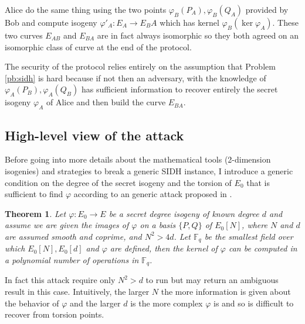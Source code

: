 \documentclass[12pt,a4paper]{article}
\newtheorem{theorem}{Theorem}
\begin{document}
	Alice do the same thing using the two points $\varphi_B(P_A),\varphi_B(Q_A)$ provided by Bob and
	compute isogeny  $\varphi'_A:E_A\to E_BA$ which has kernel $\varphi_B(\ker\varphi_A)$.
	These two curves $E_{AB}$ and $E_{BA}$ are in fact always isomorphic so they both agreed on an
	isomorphic class of curve at the end of the protocol.

	The security of the protocol relies entirely on the assumption that Problem \ref{pb:sidh} is hard
	because if not then an adversary,
	with the knowledge of $\varphi_A(P_B),\varphi_A(Q_B)$ has sufficient information to recover entirely
	the secret isogeny $\varphi_A$ of Alice and then build the curve $E_{BA}$.
	\subsection{High-level view of the attack}
	Before going into more details about the mathematical tools (2-dimension isogenies)
	and strategies to break a generic SIDH instance, I introduce a generic condition
	on the degree of the secret isogeny and the torsion of $E_0$ that is sufficient
	to find $\varphi$ according to an generic attack proposed in {\cite{sidhpolyattack}}. 
	\begin{theorem}\label{thm:sidh}
		Let $\varphi:E_0 \to E$ be a secret degree isogeny of known degree $d$ and assume we are given the images of $\varphi$ on a basis $\{P,Q\}$ of $E_0[N]$,
		where $N$ and $d$ are assumed smooth and coprime, and $N^2 > 4d$. Let $\mathbb{F}_q$ be the
		smallest field over which $E_0[N],E_0[d]$ and $\varphi$ are defined, then the kernel of
		$\varphi$ can be computed in a polynomial number of operations in $\mathbb{F}_q$.
	\end{theorem}
	In fact this attack require only $N^2>d$ to run but may return an ambiguous result
	in this case. Intuitively, the larger $N$ the more information is given about
	the behavior of $\varphi$ and the larger $d$ is the more complex $\varphi$ is and
	so is difficult to recover from torsion points.
\end{document}

